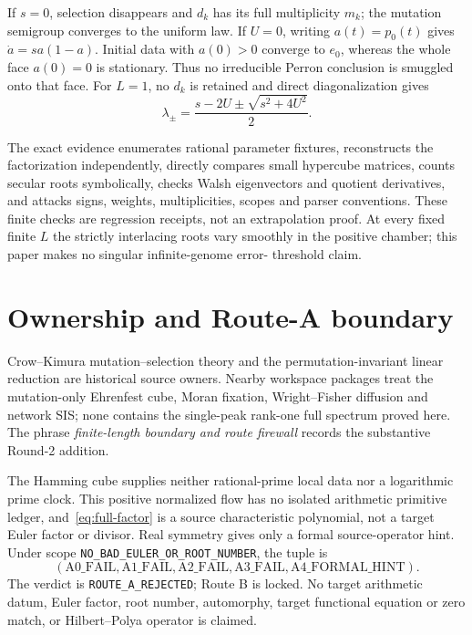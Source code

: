 \documentclass[10pt]{article}
\begin{document}
If $s=0$, selection disappears and $d_k$ has its full multiplicity $m_k$;
the mutation semigroup converges to the uniform law.  If $U=0$, writing
$a(t)=p_0(t)$ gives $\dot a=sa(1-a)$.  Initial data with $a(0)>0$ converge to
$e_0$, whereas the whole face $a(0)=0$ is stationary.  Thus no irreducible
Perron conclusion is smuggled onto that face.  For $L=1$, no $d_k$ is
retained and direct diagonalization gives
\begin{equation}\label{eq:l-one}
 \lambda_\pm=\frac{s-2U\pm\sqrt{s^2+4U^2}}2.
\end{equation}

The exact evidence enumerates rational parameter fixtures, reconstructs the
factorization independently, directly compares small hypercube matrices,
counts secular roots symbolically, checks Walsh eigenvectors and quotient
derivatives, and attacks signs, weights, multiplicities, scopes and parser
conventions.  These finite checks are regression receipts, not an extrapolation
proof.  At every fixed finite $L$ the strictly interlacing roots vary smoothly
in the positive chamber; this paper makes no singular infinite-genome error-
threshold claim.

\section{Ownership and Route-A boundary}

Crow--Kimura mutation--selection theory and the permutation-invariant linear
reduction are historical source owners.  Nearby workspace packages treat the
mutation-only Ehrenfest cube, Moran fixation, Wright--Fisher diffusion and
network SIS; none contains the single-peak rank-one full spectrum proved here.
The phrase \emph{finite-length boundary and route firewall} records the
substantive Round-2 addition.

The Hamming cube supplies neither rational-prime local data nor a logarithmic
prime clock.  This positive normalized flow has no isolated arithmetic
primitive ledger, and~\eqref{eq:full-factor} is a source characteristic
polynomial, not a target Euler factor or divisor.  Real symmetry gives only a
formal source-operator hint.  Under scope
\texttt{NO\_BAD\_EULER\_OR\_ROOT\_NUMBER}, the tuple is
\[
 (\mathrm{A0\_FAIL},\mathrm{A1\_FAIL},\mathrm{A2\_FAIL},
   \mathrm{A3\_FAIL},\mathrm{A4\_FORMAL\_HINT}).
\]
The verdict is \texttt{ROUTE\_A\_REJECTED}; Route B is locked.  No target
arithmetic datum, Euler factor, root number, automorphy, target functional
equation or zero match, or Hilbert--Polya operator is claimed.
\fi
\end{document}
